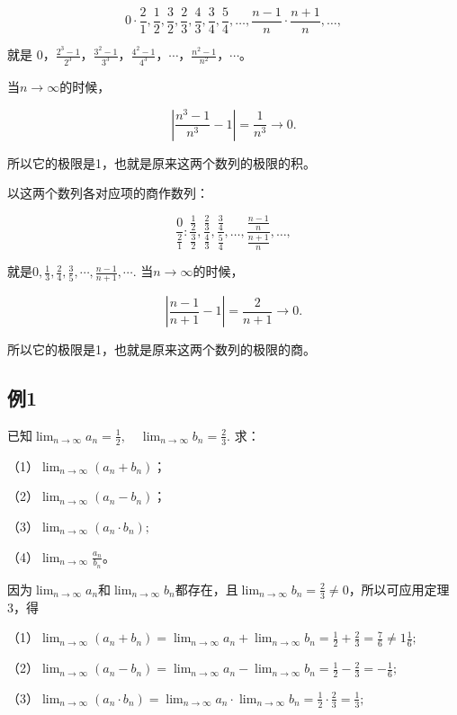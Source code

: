 \[
0 \cdot \frac{2}{1}, \frac{1}{2}, \frac{3}{2}, \frac{2}{3}, \frac{4}{3}, \frac{3}{4}, \frac{5}{4}, \dots, \frac{n - 1}{n} \cdot \frac{n + 1}{n}, \dots,
\]

就是
0，\(\frac{2^3 - 1}{2^3}\)，\(\frac{3^2 - 1}{3^3}\)，\(\frac{4^2 - 1}{4^3}\)，\(\cdots\)，\(\frac{n^2 - 1}{n^2}\)，\(\cdots\)。

当\(n \to \infty\)的时候，

\[
\left| \frac{n^{3} - 1}{n^{3}} - 1 \right| = \frac{1}{n^{3}} \rightarrow 0.
\]

所以它的极限是1，也就是原来这两个数列的极限的积。

以这两个数列各对应项的商作数列：

\[
\frac{0}{\frac{2}{1}}: \frac{\frac{1}{2}}{\frac{3}{2}}, \frac{\frac{2}{3}}{\frac{4}{3}}, \frac{\frac{3}{4}}{\frac{5}{4}}, \dots, \frac{\frac{n - 1}{n}}{\frac{n + 1}{n}}, \dots,
\]

就是\(0, \frac{1}{3}, \frac{2}{4}, \frac{3}{5}, \cdots, \frac{n-1}{n+1}, \cdots.\)
当\(n \to \infty\)的时候，

\[
\left| \frac{n - 1}{n + 1} - 1 \right| = \frac{2}{n + 1} \rightarrow 0.
\]

所以它的极限是1，也就是原来这两个数列的极限的商。

\subsection{例1}

已知\(\lim_{n\to \infty}a_n = \frac{1}{2},\quad \lim_{n\to \infty}b_n = \frac{2}{3}.\)
求：

（1）\(\lim_{n\to \infty}(a_n + b_n)\)；

（2）\(\lim_{n\to \infty}(a_n - b_n)\)；

（3）\(\lim_{n\to \infty}(a_n\cdot b_n);\)

（4）\(\lim_{n\to \infty}\frac{a_n}{b_n}\)。

因为\(\lim_{n\to \infty}a_n\)和\(\lim_{n\to \infty}b_n\)都存在，且\(\lim_{n\to \infty}b_n = \frac{2}{3}\neq 0\)，所以可应用定理3，得

（1）\(\lim_{n\to \infty}(a_n + b_n) = \lim_{n\to \infty}a_n + \lim_{n\to \infty}b_n = \frac{1}{2} +\frac{2}{3} = \frac{7}{6}\neq 1\frac{1}{6};\)

（2）\(\lim_{n\to \infty}(a_n - b_n) = \lim_{n\to \infty}a_n - \lim_{n\to \infty}b_n = \frac{1}{2} -\frac{2}{3} = -\frac{1}{6};\)

（3）\(\lim_{n\to \infty}(a_n\cdot b_n) = \lim_{n\to \infty}a_n\cdot \lim_{n\to \infty}b_n = \frac{1}{2}\cdot \frac{2}{3} = \frac{1}{3};\)

